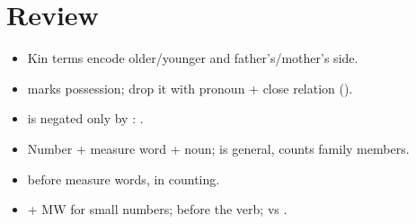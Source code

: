 \section*{Review}
\begin{itemize}
  \item Kin terms encode older/younger and father's/mother's side.
  \item {} marks possession; drop it with pronoun + close relation ().
  \item {} is negated only by : .
  \item Number + measure word + noun;  is general,  counts family members.
  \item {} before measure words,  in counting.
  \item {} + MW for small numbers;  before the verb;  vs .
\end{itemize}
